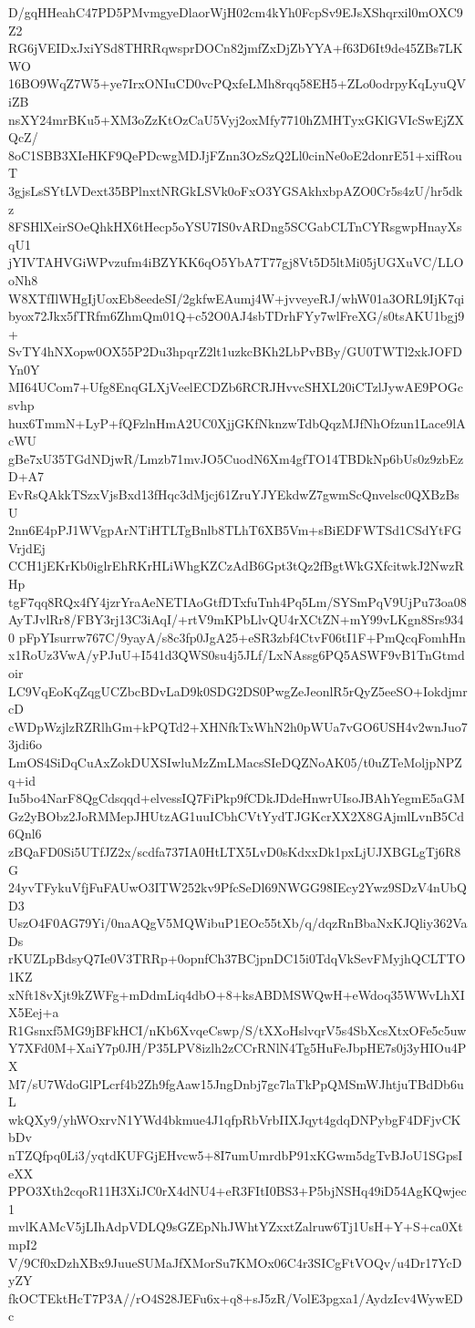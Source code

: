 D/gqHHeahC47PD5PMvmgyeDlaorWjH02cm4kYh0FcpSv9EJsXShqrxil0mOXC9Z2
RG6jVEIDxJxiYSd8THRRqwsprDOCn82jmfZxDjZbYYA+f63D6It9de45ZBs7LKWO
16BO9WqZ7W5+ye7IrxONIuCD0vcPQxfeLMh8rqq58EH5+ZLo0odrpyKqLyuQViZB
nsXY24mrBKu5+XM3oZzKtOzCaU5Vyj2oxMfy7710hZMHTyxGKlGVIcSwEjZXQcZ/
8oC1SBB3XIeHKF9QePDcwgMDJjFZnn3OzSzQ2Ll0cinNe0oE2donrE51+xifRouT
3gjsLsSYtLVDext35BPlnxtNRGkLSVk0oFxO3YGSAkhxbpAZO0Cr5s4zU/hr5dkz
8FSHlXeirSOeQhkHX6tHecp5oYSU7IS0vARDng5SCGabCLTnCYRsgwpHnayXsqU1
jYIVTAHVGiWPvzufm4iBZYKK6qO5YbA7T77gj8Vt5D5ltMi05jUGXuVC/LLOoNh8
W8XTfIlWHgIjUoxEb8eedeSI/2gkfwEAumj4W+jvveyeRJ/whW01a3ORL9IjK7qi
byox72Jkx5fTRfm6ZhmQm01Q+c52O0AJ4sbTDrhFYy7wlFreXG/s0tsAKU1bgj9+
SvTY4hNXopw0OX55P2Du3hpqrZ2lt1uzkcBKh2LbPvBBy/GU0TWTl2xkJOFDYn0Y
MI64UCom7+Ufg8EnqGLXjVeelECDZb6RCRJHvvcSHXL20iCTzlJywAE9POGcsvhp
hux6TmmN+LyP+fQFzlnHmA2UC0XjjGKfNknzwTdbQqzMJfNhOfzun1Lace9lAcWU
gBe7xU35TGdNDjwR/Lmzb71mvJO5CuodN6Xm4gfTO14TBDkNp6bUs0z9zbEzD+A7
EvRsQAkkTSzxVjsBxd13fHqc3dMjcj61ZruYJYEkdwZ7gwmScQnvelsc0QXBzBsU
2nn6E4pPJ1WVgpArNTiHTLTgBnlb8TLhT6XB5Vm+sBiEDFWTSd1CSdYtFGVrjdEj
CCH1jEKrKb0iglrEhRKrHLiWhgKZCzAdB6Gpt3tQz2fBgtWkGXfcitwkJ2NwzRHp
tgF7qq8RQx4fY4jzrYraAeNETIAoGtfDTxfuTnh4Pq5Lm/SYSmPqV9UjPu73oa08
AyTJvlRr8/FBY3rj13C3iAqI/+rtV9mKPbLlvQU4rXCtZN+mY99vLKgn8Srs9340
pFpYIsurrw767C/9yayA/s8c3fp0JgA25+eSR3zbf4CtvF06tI1F+PmQcqFomhHn
x1RoUz3VwA/yPJuU+I541d3QWS0su4j5JLf/LxNAssg6PQ5ASWF9vB1TnGtmdoir
LC9VqEoKqZqgUCZbcBDvLaD9k0SDG2DS0PwgZeJeonlR5rQyZ5eeSO+IokdjmrcD
cWDpWzjlzRZRlhGm+kPQTd2+XHNfkTxWhN2h0pWUa7vGO6USH4v2wnJuo73jdi6o
LmOS4SiDqCuAxZokDUXSIwluMzZmLMacsSIeDQZNoAK05/t0uZTeMoljpNPZq+id
Iu5bo4NarF8QgCdsqqd+elvessIQ7FiPkp9fCDkJDdeHnwrUIsoJBAhYegmE5aGM
Gz2yBObz2JoRMMepJHUtzAG1uuICbhCVtYydTJGKcrXX2X8GAjmlLvnB5Cd6Qnl6
zBQaFD0Si5UTfJZ2x/scdfa737IA0HtLTX5LvD0sKdxxDk1pxLjUJXBGLgTj6R8G
24yvTFykuVfjFuFAUwO3ITW252kv9PfcSeDl69NWGG98IEcy2Ywz9SDzV4nUbQD3
UszO4F0AG79Yi/0naAQgV5MQWibuP1EOc55tXb/q/dqzRnBbaNxKJQliy362VaDs
rKUZLpBdsyQ7Ie0V3TRRp+0opnfCh37BCjpnDC15i0TdqVkSevFMyjhQCLTTO1KZ
xNft18vXjt9kZWFg+mDdmLiq4dbO+8+ksABDMSWQwH+eWdoq35WWvLhXIX5Eej+a
R1Gsnxf5MG9jBFkHCI/nKb6XvqeCswp/S/tXXoHslvqrV5s4SbXcsXtxOFe5c5uw
Y7XFd0M+XaiY7p0JH/P35LPV8izlh2zCCrRNlN4Tg5HuFeJbpHE7s0j3yHIOu4PX
M7/sU7WdoGlPLcrf4b2Zh9fgAaw15JngDnbj7gc7laTkPpQMSmWJhtjuTBdDb6uL
wkQXy9/yhWOxrvN1YWd4bkmue4J1qfpRbVrbIIXJqyt4gdqDNPybgF4DFjvCKbDv
nTZQfpq0Li3/yqtdKUFGjEHvcw5+8I7umUmrdbP91xKGwm5dgTvBJoU1SGpsIeXX
PPO3Xth2cqoR11H3XiJC0rX4dNU4+eR3FItI0BS3+P5bjNSHq49iD54AgKQwjec1
mvlKAMcV5jLIhAdpVDLQ9sGZEpNhJWhtYZxxtZalruw6Tj1UsH+Y+S+ca0XtmpI2
V/9Cf0xDzhXBx9JuueSUMaJfXMorSu7KMOx06C4r3SICgFtVOQv/u4Dr17YcDyZY
fkOCTEktHcT7P3A//rO4S28JEFu6x+q8+sJ5zR/VolE3pgxa1/AydzIcv4WywEDc
